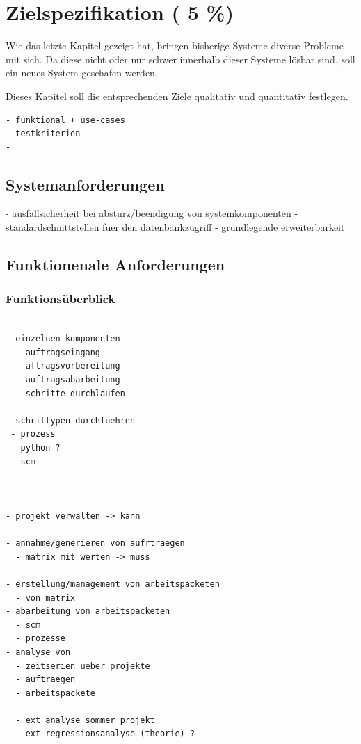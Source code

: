 \chapter{Zielspezifikation ( 5 \%)}

Wie das letzte Kapitel gezeigt hat,
bringen bisherige Systeme diverse Probleme mit sich.
Da diese nicht oder nur schwer innerhalb dieser Systeme l\"osbar sind,
soll ein neues System geschafen werden.

Dieses Kapitel soll die entsprechenden Ziele qualitativ und quantitativ festlegen.







\begin{verbatim}
- funktional + use-cases
- testkriterien
-
\end{verbatim}


\section{Systemanforderungen}



- ausfallsicherheit bei absturz/beendigung
  von systemkomponenten
- standardschnittstellen fuer den datenbankzugriff
- grundlegende erweiterbarkeit

\section{Funktionenale Anforderungen}
\subsection{Funktions\"uberblick}
\begin{verbatim}

- einzelnen komponenten
  - auftragseingang
  - aftragsvorbereitung
  - auftragsabarbeitung
  - schritte durchlaufen

- schrittypen durchfuehren
 - prozess
 - python ?
 - scm



- projekt verwalten -> kann

- annahme/generieren von aufrtraegen
  - matrix mit werten -> muss

- erstellung/management von arbeitspacketen
  - von matrix
- abarbeitung von arbeitspacketen
  - scm
  - prozesse
- analyse von
  - zeitserien ueber projekte
  - auftraegen
  - arbeitspackete

  - ext analyse sommer projekt
  - ext regressionsanalyse (theorie) ?
\end{verbatim}

